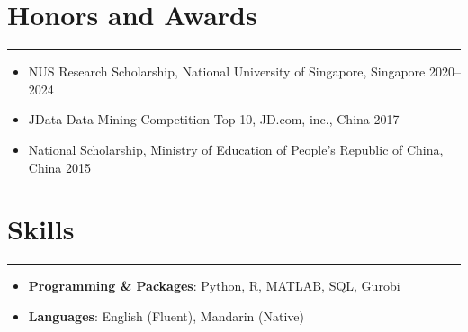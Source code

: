 \documentclass[12pt, a4paper]{article}
\begin{document}
{%

\section*{Honors and Awards}
\vspace*{4pt}
\hrule

\begin{itemize}[leftmargin=30pt, parsep=0.5pt]
	\item NUS Research Scholarship, National University of Singapore, Singapore \hfill 2020--2024
	\item JData Data Mining Competition Top 10, JD.com, inc., China \hfill 2017
	\item National Scholarship, Ministry of Education of People's Republic of China, China \hfill 2015
\end{itemize}




\section*{Skills}
\vspace*{4pt}
\hrule

\begin{itemize}[leftmargin=16pt]
	\item[] \textbf{Programming \& Packages}: Python, R, MATLAB, SQL, Gurobi
	\item[] \textbf{Languages}: English (Fluent), Mandarin (Native)
\end{itemize}


}

\end{document}
